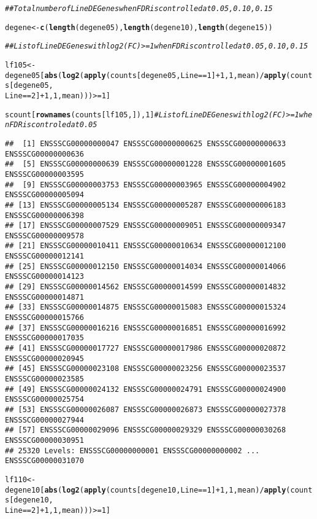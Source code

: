 \documentclass{article}\usepackage[]{graphicx}\usepackage[]{color}
\makeatletter
\newcommand{\hlnum}[1]{\textcolor[rgb]{0.686,0.059,0.569}{#1}}%
\newcommand{\hlcom}[1]{\textcolor[rgb]{0.678,0.584,0.686}{\textit{#1}}}%
\newcommand{\hlopt}[1]{\textcolor[rgb]{0,0,0}{#1}}%
\newcommand{\hlstd}[1]{\textcolor[rgb]{0.345,0.345,0.345}{#1}}%
\newcommand{\hlkwb}[1]{\textcolor[rgb]{0.69,0.353,0.396}{#1}}%
\newcommand{\hlkwd}[1]{\textcolor[rgb]{0.737,0.353,0.396}{\textbf{#1}}}%
\newenvironment{kframe}{%
 \def\at@end@of@kframe{}%
 \ifinner\ifhmode%
  \def\at@end@of@kframe{\end{minipage}}%
  \begin{minipage}{\columnwidth}%
 \fi\fi%
 \def\FrameCommand##1{\hskip\@totalleftmargin \hskip-\fboxsep
 \colorbox{shadecolor}{##1}\hskip-\fboxsep
     \hskip-\linewidth \hskip-\@totalleftmargin \hskip\columnwidth}%
 \MakeFramed {\advance\hsize-\width
   \@totalleftmargin\z@ \linewidth\hsize
   \@setminipage}}%
 {\par\unskip\endMakeFramed%
 \at@end@of@kframe}
\newenvironment{knitrout}{}{} %
\makeatother
\begin{document}
\begin{knitrout}
\begin{kframe}
\begin{alltt}
\hlcom{## Total number of Line DE Genes when FDR is controlled at 0.05, 0.10, 0.15}

\hlstd{degene} \hlkwb{<-} \hlkwd{c}\hlstd{(}\hlkwd{length}\hlstd{(degene05),} \hlkwd{length}\hlstd{(degene10),} \hlkwd{length}\hlstd{(degene15))}

\hlcom{## List of Line DE Genes with log2(FC) >=1 when FDR is controlled at 0.05, 0.10, 0.15}

\hlstd{lf105} \hlkwb{<-} \hlstd{degene05[}\hlkwd{abs}\hlstd{(}\hlkwd{log2}\hlstd{(}\hlkwd{apply}\hlstd{(counts[degene05, Line} \hlopt{==} \hlnum{1}\hlstd{]} \hlopt{+} \hlnum{1}\hlstd{,} \hlnum{1}\hlstd{, mean)}\hlopt{/}\hlkwd{apply}\hlstd{(counts[degene05,}
    \hlstd{Line} \hlopt{==} \hlnum{2}\hlstd{]} \hlopt{+} \hlnum{1}\hlstd{,} \hlnum{1}\hlstd{, mean)))} \hlopt{>=} \hlnum{1}\hlstd{]}

\hlstd{scount[}\hlkwd{rownames}\hlstd{(counts[lf105, ]),} \hlnum{1}\hlstd{]}  \hlcom{# List of  Line DE Genes with log2(FC) >=1 when FDR is controled at 0.05}
\end{alltt}
\begin{verbatim}
##  [1] ENSSSCG00000000047 ENSSSCG00000000625 ENSSSCG00000000633 ENSSSCG00000000636
##  [5] ENSSSCG00000000639 ENSSSCG00000001228 ENSSSCG00000001605 ENSSSCG00000003595
##  [9] ENSSSCG00000003753 ENSSSCG00000003965 ENSSSCG00000004902 ENSSSCG00000005094
## [13] ENSSSCG00000005134 ENSSSCG00000005287 ENSSSCG00000006183 ENSSSCG00000006398
## [17] ENSSSCG00000007529 ENSSSCG00000009051 ENSSSCG00000009347 ENSSSCG00000009578
## [21] ENSSSCG00000010411 ENSSSCG00000010634 ENSSSCG00000012100 ENSSSCG00000012141
## [25] ENSSSCG00000012150 ENSSSCG00000014034 ENSSSCG00000014066 ENSSSCG00000014123
## [29] ENSSSCG00000014562 ENSSSCG00000014599 ENSSSCG00000014832 ENSSSCG00000014871
## [33] ENSSSCG00000014875 ENSSSCG00000015083 ENSSSCG00000015324 ENSSSCG00000015766
## [37] ENSSSCG00000016216 ENSSSCG00000016851 ENSSSCG00000016992 ENSSSCG00000017035
## [41] ENSSSCG00000017727 ENSSSCG00000017986 ENSSSCG00000020872 ENSSSCG00000020945
## [45] ENSSSCG00000023108 ENSSSCG00000023256 ENSSSCG00000023537 ENSSSCG00000023585
## [49] ENSSSCG00000024132 ENSSSCG00000024791 ENSSSCG00000024900 ENSSSCG00000025754
## [53] ENSSSCG00000026087 ENSSSCG00000026873 ENSSSCG00000027378 ENSSSCG00000027944
## [57] ENSSSCG00000029096 ENSSSCG00000029329 ENSSSCG00000030268 ENSSSCG00000030951
## 25320 Levels: ENSSSCG00000000001 ENSSSCG00000000002 ... ENSSSCG00000031070
\end{verbatim}
\begin{alltt}
\hlstd{lf110} \hlkwb{<-} \hlstd{degene10[}\hlkwd{abs}\hlstd{(}\hlkwd{log2}\hlstd{(}\hlkwd{apply}\hlstd{(counts[degene10, Line} \hlopt{==} \hlnum{1}\hlstd{]} \hlopt{+} \hlnum{1}\hlstd{,} \hlnum{1}\hlstd{, mean)}\hlopt{/}\hlkwd{apply}\hlstd{(counts[degene10,}
    \hlstd{Line} \hlopt{==} \hlnum{2}\hlstd{]} \hlopt{+} \hlnum{1}\hlstd{,} \hlnum{1}\hlstd{, mean)))} \hlopt{>=} \hlnum{1}\hlstd{]}


\end{alltt}
\end{kframe}
\end{knitrout}
\end{document}
